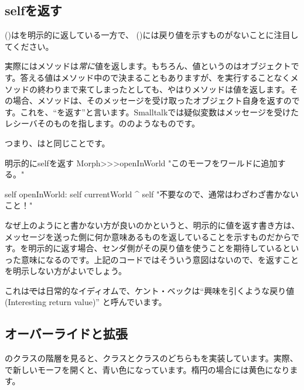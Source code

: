 \documentclass[a4paper,10pt,twoside]{book}
\begin{document}
\subsection{selfを返す} 

 ()はを明示的に返している一方で、 ()には戻り値を示すものがないことに注目してください。

実際にはメソッドは\emph{常に}値を返します。もちろん、値というのはオブジェクトです。答える値はメソッド中の\ct{^}で決まることもありますが、\ct{^}を実行することなくメソッドの終わりまで来てしまったとしても、やはりメソッドは値を返します。その場合、メソッドは、そのメッセージを受け取ったオブジェクト自身を返すのです。これを、``\self を返す''と言います。Smalltalkでは疑似変数\self はメッセージを受けたレシーバそのものを指します。ののようなものです。

つまり、はと同じことです。

\begin{method}[openInWorldReturnSelf]{明示的にselfを返す}
Morph>>>openInWorld
	"このモーフをワールドに追加する。"
	
    self openInWorld: self currentWorld
	^ self		"不要なので、通常はわざわざ書かないこと！"
\end{method}

なぜ上のようにと書かない方が良いのかというと、明示的に値を返す書き方は、メッセージを送った側に何か意味あるものを返していることを示すものだからです。\self を明示的に返す場合、センダ側がその戻り値を使うことを期待しているといった意味になるのです。上記のコードではそういう意図はないので、\self を返すことを明示しない方がよいでしょう。

これは\st では日常的なイディオムで、ケント・ベックは``興味を引くような戻り値(Interesting return value)'' \cite{Beck97a} と呼んでいます。


\subsection{オーバーライドと拡張}

のクラスの階層を見ると、クラスと\mbox{}クラスのどちらもを実装しています。実際、で新しいモーフを開くと、青い色になっています。楕円の場合には黄色になります。
\end{document}

